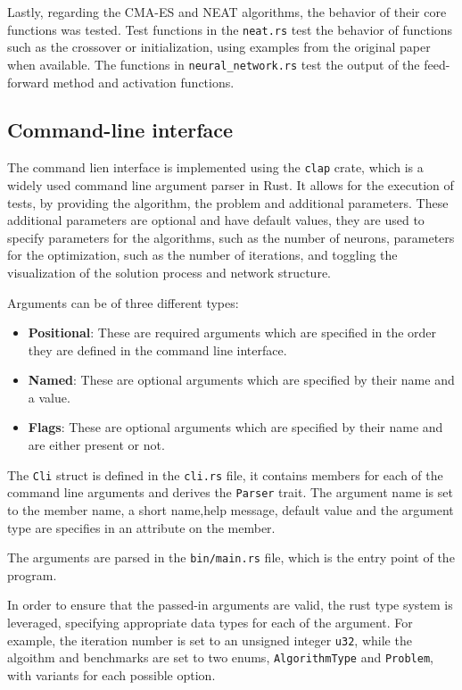 Lastly, regarding the CMA-ES and NEAT algorithms, the behavior of their core functions was tested. Test functions in the \texttt{neat.rs} test the
behavior of functions such as the crossover or initialization, using examples from the original paper \cite{neat} when available. The functions in
\texttt{neural\_network.rs} test the output of the feed-forward method and activation functions.

\subsection{Command-line interface}

The command lien interface is implemented using the \texttt{clap} crate, which is a widely used command line argument parser in Rust.
It allows for the execution of tests, by providing the algorithm, the problem and additional parameters. These additional parameters are optional and have
default values, they are used to specify parameters for the algorithms, such as the number of neurons, parameters for the optimization, such as the number of
iterations, and toggling the visualization of the solution process and network structure.

Arguments can be of three different types:

\begin{itemize}
    \item \textbf{Positional}: These are required arguments which are specified in the order they are defined in the command line interface.
    \item \textbf{Named}: These are optional arguments which are specified by their name and a value.
    \item \textbf{Flags}: These are optional arguments which are specified by their name and are either present or not.
\end{itemize}

The \texttt{Cli} struct is defined in the \texttt{cli.rs} file, it contains members for each of the command line arguments and derives the \texttt{Parser} trait.
The argument name is set to the member name, a short name,help message, default value and the argument type are specifies in an attribute on the member.

The arguments are parsed in the \texttt{bin/main.rs} file, which is the entry point of the program.

In order to ensure that the passed-in arguments are valid, the rust type system is leveraged, specifying appropriate data types for each of the argument.
For example, the iteration number is set to an unsigned integer \texttt{u32}, while the algoithm and benchmarks are set to two enums, \texttt{AlgorithmType} and
\texttt{Problem}, with variants for each possible option.

